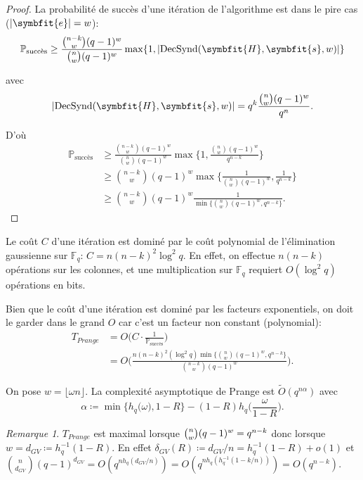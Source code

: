 \documentclass[a4paper,11pt,headings=small,footinclude=false]{scrartcl}
\theoremstyle{definition}
\theoremstyle{remark}
\newtheorem*{remark}{Remarque}
\begin{document}
\begin{proof}
La probabilité de succès d'une itération de l'algorithme est dans le pire cas ($|\symbfit{e}|=w$):
\[ \mathbb{P}_{\text{succès}} \geq \frac{\binom{n-k}{w}(q-1)^w}{\binom{n}{w}(q-1)^w} \max \{1, |\text{DecSynd}(\symbfit{H},\symbfit{s},w)|\}\]

avec 
\[ |\text{DecSynd}(\symbfit{H},\symbfit{s},w)| = q^k \frac{\binom{n}{w}(q-1)^w}{q^n}. \]

D'où
\begin{align*}
    \mathbb{P}_{\text{succès}} &\geq \frac{\binom{n-k}{w}(q-1)^w}{\binom{n}{w}(q-1)^w} \max \Big\{1,\frac{\binom{n}{w}(q-1)^w}{q^{n-k}}\Big\}\\
    &\geq \binom{n-k}{w}(q-1)^w \max \Big\{\frac{1}{\binom{n}{w}(q-1)^w},\frac{1}{q^{n-k}}\Big\}\\
    &\geq \binom{n-k}{w}(q-1)^w \frac{1}{\min \{\binom{n}{w}(q-1)^w,q^{n-k}\}}.
\end{align*}
\end{proof}

Le coût $C$ d'une itération est dominé par le coût polynomial de l'élimination gaussienne sur $\mathbb{F}_q$: $C=n(n-k)^2\log^2 q$. En effet, on effectue $n(n-k)$ opérations sur les colonnes, et une multiplication sur $\mathbb{F}_q$ requiert $O(\log^2 q)$ opérations en bits.

Bien que le coût d'une itération est dominé par les facteurs exponentiels, on doit le garder dans le grand $O$ car c'est un facteur non constant (polynomial):
\begin{align*}
    T_{Prange} &= O\Big(C \cdot \frac{1}{\mathbb{P}_{\text{succès}}}\Big)\\
&= O\Bigg(\frac{n(n-k)^2(\log^2 q)\min \big\{\binom{n}{w}(q-1)^w,q^{n-k}\big\}}{\binom{n-k}{w}(q-1)^w} \Bigg).
\end{align*}

On pose $w=\lfloor \omega n \rfloor$.
La complexité asymptotique de Prange est $\tilde{O}(q^{n\alpha})$
avec \[\alpha\coloneq \min\big\{ h_q\big(\omega\big), 1-R \big\} - ( 1-R)h_q\bigg(\frac{\omega}{1-R}\bigg).\]

\begin{remark}
$T_{Prange}$ est maximal lorsque $\tbinom{n}{w}(q-1)^w=q^{n-k}$ donc lorsque $w=d_{GV}\coloneq h_q^{-1}(1-R)$. En effet $\delta_{GV}(R)\coloneq d_{GV}/n=h_q^{-1}(1-R)+o(1)$ et $\binom{n}{d_{GV}}(q-1)^{d_{GV}}=O(q^{nh_q(d_{GV}/n)})=O(q^{nh_q(h_q^{-1}(1-k/n))})=O(q^{n-k})$. %
\end{remark}
\end{document}
